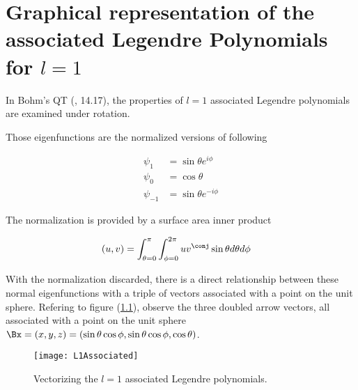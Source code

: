 

\chapter{Graphical representation of the associated Legendre Polynomials for $l=1$}
\label{chap:L1Associated}
{}
\date{Aug 16, 2009}

\beginArtNoToc


In Bohm's QT (\cite{bohm1989qt}, 14.17), the properties of $l=1$ associated Legendre polynomials are examined under rotation.

Those eigenfunctions are the normalized versions of following

\begin{align}\label{eqn:foo1}
\psi_1 &= \sin\theta e^{i\phi} \\
\psi_0 &= \cos\theta \\
\psi_{-1} &= \sin\theta e^{-i\phi}
\end{align}

The normalization is provided by a surface area inner product

\begin{align}\label{eqn:foo2}
(u,v) &= \int_{\theta=0}^{\pi} \int_{\phi=0}^{2\pi} u v^\conj \sin\theta d\theta d\phi
\end{align}

With the normalization discarded, there is a direct relationship between these normal eigenfunctions with a triple of vectors associated with a point on the unit sphere.  Refering to figure (\ref{fig:L1Associated}), observe the three doubled arrow vectors, all associated with a point on the unit sphere $\Bx = (x,y,z) = (\sin\theta \cos\phi, \sin\theta \cos\phi, \cos\theta)$.  

\begin{figure}[htp]
\centering
\texttt{[image: L1Associated]}
\caption{Vectorizing the $l=1$ associated Legendre polynomials.}\label{fig:L1Associated}
\end{figure}

